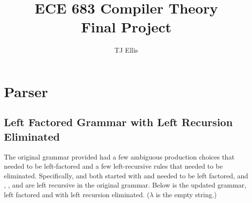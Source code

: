 \documentclass{article}
\author{TJ Ellis}
\title{ECE 683 Compiler Theory\\Final Project}
\begin{document}
\maketitle



\section{Parser}
\subsection{Left Factored Grammar with Left Recursion Eliminated}
The original grammar provided had a few ambiguous production choices
that needed to be left-factored and a few left-recursive rules that
needed to be eliminated. Specifically,  and
 both started with  and needed to be left
factored, and , , and 
are left recursive in the original grammar. Below is the updated
grammar, left factored and with left recursion eliminated. ($\lambda$
is the empty string.)
\end{document}
